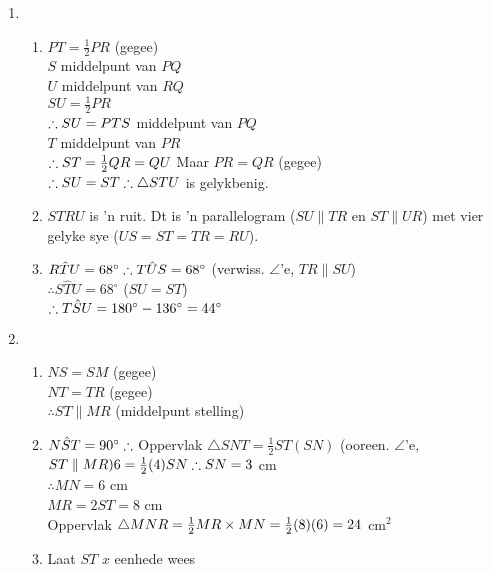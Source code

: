 \begin{eocsolutions}{}
{\begin{enumerate}[itemsep=5pt, label=\textbf{\arabic*}. ]
\item %
 \begin{enumerate}[noitemsep, label=\textbf{(\alph*)} ]
\item
$PT=\frac{1}{2} PR$ (gegee)\\
$S$ middelpunt van $PQ$\\
$U$ middelpunt van $RQ$\\
$SU=\frac{1}{2}PR$\\
$\therefore SU=PT\\
S$ middelpunt van $PQ$\\
$T$ middelpunt van $PR$\\
$\therefore ST = \frac{1}{2}QR=QU\\$
Maar $PR=QR$ (gegee)\\
$\therefore SU=ST\\
\therefore \triangle STU$ is gelykbenig.
\item $STRU$ is 'n ruit. Dt is 'n parallelogram ($SU \parallel TR$ en $ST \parallel UR$) met vier gelyke sye ($US=ST=TR=RU$).
\item $R\hat{T}U = 68^{\circ}\\
\therefore T\hat{U}S = 68^{\circ}$ (verwiss. $\angle$'e, $TR \parallel SU$)\\
$\therefore S\hat{T}U = 68^{\circ}$ ($SU=ST$)\\
$\therefore T\hat{S}U = 180^{\circ} - 136^{\circ}\\
=44^{\circ}$
\end{enumerate}
\item %
 \begin{enumerate}[noitemsep, label=\textbf{(\alph*)} ]
\item $NS=SM$ (gegee)\\
$NT=TR$ (gegee)\\
$\therefore ST \parallel MR$ (middelpunt stelling)
\item $N\hat{S}T = 90^{\circ}\\
\therefore $ Oppervlak $\triangle SNT=\frac{1}{2} ST(SN)$ (ooreen. $\angle$'e, $ST\parallel MR)\\
6 = \frac{1}{2}(4)SN\\
\therefore SN = 3$ cm\\
$\therefore MN = 6$ cm\\
$MR = 2ST = 8$ cm\\
Oppervlak $\triangle MNR = \frac{1}{2} MR \times MN\\
=\frac{1}{2} (8)(6)\\
=24$ cm$^2$
\item Laat $ST$ $x$ eenhede wees\\

\end{enumerate}
\end{enumerate}}
\end{eocsolutions}
